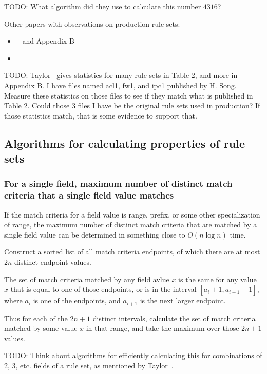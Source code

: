 \documentclass[acmsmall]{acmart}
\newcommand{\todo}[1]{}
\renewcommand{\todo}[1]{{\color{red} TODO: {#1}}}
\begin{document}
\todo{What algorithm did they use to calculate this number $4316$?}

Other papers with observations on production rule sets:
\begin{itemize}
\item ~\cite[Sec 2]{TT2004b} and Appendix B
\item ~\cite[Sec 3]{TT2004a}
\end{itemize}

\todo{Taylor~\cite[Sec 2.2]{TT2004b} gives statistics for many rule sets in Table 2, and more in Appendix B.
I have files named acl1, fw1, and ipc1 published by H. Song.  Measure these statistics on those files to see if they match what is published in Table 2.  Could those 3 files I have be the original rule sets used in production?  If those statistics match, that is some evidence to support that.}


\subsection{Algorithms for calculating properties of rule sets}


\subsubsection{For a single field, maximum number of distinct match criteria that a single field value matches}

If the match criteria for a field value is range, prefix, or some other specialization of range, the maximum number of distinct match criteria that are matched by a single field value can be determined in something close to $O(n \log n)$ time.

Construct a sorted list of all match criteria endpoints, of which there are at most $2n$ distinct endpoint values.

The set of match criteria matched by any field avlue $x$ is the same for any value $x$ that is equal to one of those endpoints, or is in the interval $[a_{i}+1, a_{i+1}-1]$, where $a_i$ is one of the endpoints, and $a_{i+1}$ is the next larger endpoint.

Thus for each of the $2n+1$ distinct intervals, calculate the set of match criteria matched by some value $x$ in that range, and take the maximum over those $2n+1$ values.

\todo{Think about algorithms for efficiently calculating this for combinations of 2, 3, etc. fields of a rule set, as mentioned by Taylor~\cite[Sec 2.2]{TT2004b}.}
\end{document}
